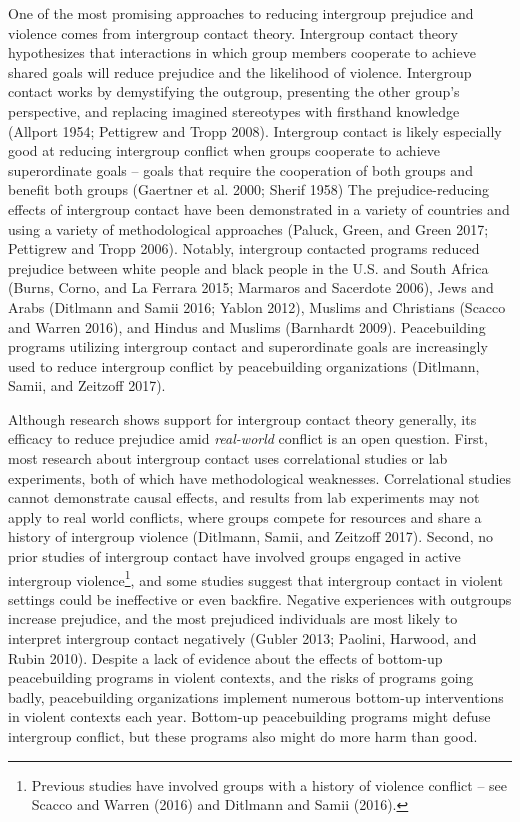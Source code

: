 \documentclass[11pt]{article}
\begin{document}
One of the most promising approaches to reducing intergroup prejudice
and violence comes from intergroup contact theory. Intergroup contact
theory hypothesizes that interactions in which group members cooperate
to achieve shared goals will reduce prejudice and the likelihood of
violence. Intergroup contact works by demystifying the outgroup,
presenting the other group's perspective, and replacing imagined
stereotypes with firsthand knowledge (Allport 1954; Pettigrew and Tropp
2008). Intergroup contact is likely especially good at reducing
intergroup conflict when groups cooperate to achieve superordinate goals
-- goals that require the cooperation of both groups and benefit both
groups (Gaertner et al. 2000; Sherif 1958) The prejudice-reducing
effects of intergroup contact have been demonstrated in a variety of
countries and using a variety of methodological approaches (Paluck,
Green, and Green 2017; Pettigrew and Tropp 2006). Notably, intergroup
contacted programs reduced prejudice between white people and black
people in the U.S. and South Africa (Burns, Corno, and La Ferrara 2015;
Marmaros and Sacerdote 2006), Jews and Arabs (Ditlmann and Samii 2016;
Yablon 2012), Muslims and Christians (Scacco and Warren 2016), and
Hindus and Muslims (Barnhardt 2009). Peacebuilding programs utilizing
intergroup contact and superordinate goals are increasingly used to
reduce intergroup conflict by peacebuilding organizations (Ditlmann,
Samii, and Zeitzoff 2017).

Although research shows support for intergroup contact theory generally,
its efficacy to reduce prejudice amid \emph{real-world} conflict is an
open question. First, most research about intergroup contact uses
correlational studies or lab experiments, both of which have
methodological weaknesses. Correlational studies cannot demonstrate
causal effects, and results from lab experiments may not apply to real
world conflicts, where groups compete for resources and share a history
of intergroup violence (Ditlmann, Samii, and Zeitzoff 2017). Second, no
prior studies of intergroup contact have involved groups engaged in
active intergroup violence\footnote{Previous studies have involved
  groups with a history of violence conflict -- see Scacco and Warren
  (2016) and Ditlmann and Samii (2016).}, and some studies suggest that
intergroup contact in violent settings could be ineffective or even
backfire. Negative experiences with outgroups increase prejudice, and
the most prejudiced individuals are most likely to interpret intergroup
contact negatively (Gubler 2013; Paolini, Harwood, and Rubin 2010).
Despite a lack of evidence about the effects of bottom-up peacebuilding
programs in violent contexts, and the risks of programs going badly,
peacebuilding organizations implement numerous bottom-up interventions
in violent contexts each year. Bottom-up peacebuilding programs might
defuse intergroup conflict, but these programs also might do more harm
than good.
\end{document}
